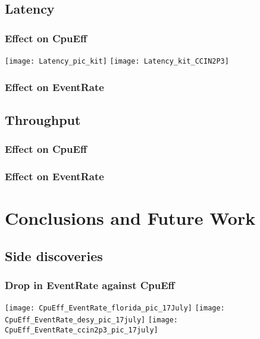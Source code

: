 \documentclass[]{article}
\begin{document}
\subsection{Latency}
\subsubsection{Effect on CpuEff}
\texttt{[image: Latency\_pic\_kit]}
\texttt{[image: Latency\_kit\_CCIN2P3]}
\subsubsection{Effect on EventRate}
\subsection{Throughput}
\subsubsection{Effect on CpuEff}
\subsubsection{Effect on EventRate}
\section{Conclusions and Future Work}
\subsection{Side discoveries}
\subsubsection{Drop in EventRate against CpuEff}
\texttt{[image: CpuEff\_EventRate\_florida\_pic\_17July]}
\texttt{[image: CpuEff\_EventRate\_desy\_pic\_17july]}
\texttt{[image: CpuEff\_EventRate\_ccin2p3\_pic\_17july]}
\end{document}
